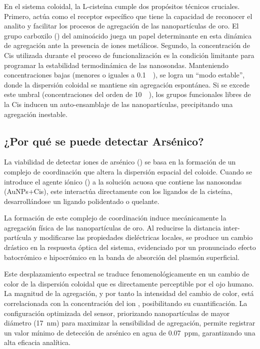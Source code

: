 En el sistema coloidal, la L-cisteína cumple dos propósitos técnicos cruciales.
Primero, actúa como el receptor específico que tiene la capacidad de reconocer
el analito y facilitar los procesos de agregación de las nanopartículas de oro.
El grupo carboxilo () del aminoácido juega un papel determinante en esta
dinámica de agregación ante la presencia de iones metálicos. Segundo, la
concentración de Cis utilizada durante el proceso de funcionalización es la
condición limitante para programar la estabilidad termodinámica de las
nanosondas. Manteniendo concentraciones bajas (menores o iguales a
\qty{0.1}{\milli\molar}), se logra un ``modo estable'', donde la dispersión
coloidal se mantiene sin agregación espontánea. Si se excede este umbral
(concentraciones del orden de \qty{10}{\milli\molar}), los grupos funcionales
libres de la Cis inducen un auto-ensamblaje de las nanopartículas, precipitando
una agregación inestable.

\subsection{¿Por qué se puede detectar Arsénico?}

La viabilidad de detectar iones de arsénico () se basa en la formación
de un complejo de coordinación que altera la dispersión espacial del coloide.
Cuando se introduce el agente iónico () a la solución acuosa que
contiene las nanosondas (AuNPs+Cis), este interactúa directamente con los
ligandos de la cisteína, desarrollándose un ligando polidentado o quelante.

La formación de este complejo de coordinación induce mecánicamente la agregación
física de las nanopartículas de oro. Al reducirse la distancia inter-partícula y
modificarse las propiedades dieléctricas locales, se produce un cambio drástico
en la respuesta óptica del sistema, evidenciado por un pronunciado efecto
batocrómico e hipocrómico en la banda de absorción del plasmón superficial.

Este desplazamiento espectral se traduce fenomenológicamente en un cambio de
color de la dispersión coloidal que es directamente perceptible por el ojo
humano. La magnitud de la agregación, y por tanto la intensidad del cambio de
color, está correlacionada con la concentración del ion , posibilitando
su cuantificación. La configuración optimizada del sensor, priorizando
nanopartículas de mayor diámetro (\qty{17}{\nano\metre}) para maximizar la sensibilidad de
agregación, permite registrar un valor mínimo de detección de arsénico en agua
de \qty{0.07}{ppm}, garantizando una alta eficacia analítica.
